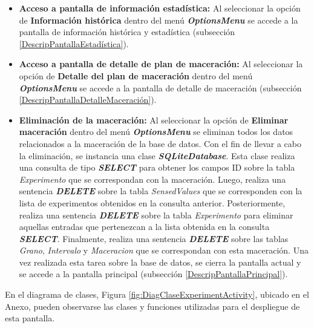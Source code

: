 \begin{itemize}
                    \item \textbf{Acceso a pantalla de información estadística:} Al seleccionar la opción de \textbf{Información histórica} dentro del menú \textbf{\textit{\gls{OptionsMenu}}} se accede a la pantalla de información histórica y estadística (subsección \ref{DescripPantallaEstadística}).
                    
                    \item \textbf{Acceso a pantalla de detalle de plan de maceración:} Al seleccionar la opción de \textbf{Detalle del plan de maceración} dentro del menú \textbf{\textit{\gls{OptionsMenu}}} se accede a la pantalla de detalle de maceración (subsección \ref{DescripPantallaDetalleMaceración}).
                    
                    \item \textbf{Eliminación de la maceración:} Al seleccionar la opción de \textbf{Eliminar maceración} dentro del menú \textbf{\textit{\gls{OptionsMenu}}} se eliminan todos los datos relacionados a la maceración de la base de datos. Con el fin de llevar a cabo la eliminación, se instancia una clase \textbf{\textit{\gls{SQLiteDatabase}}}. 
                    Esta clase realiza una consulta de tipo \textbf{\textit{\gls{SELECT}}} para obtener los campos ID sobre la tabla \textit{Experimento} que se correspondan con la maceración. Luego, realiza una sentencia \textbf{\textit{\gls{DELETE}}} sobre la tabla \textit{SensedValues} que se corresponden con la lista de experimentos obtenidos en la consulta anterior. Posteriormente, realiza una sentencia \textbf{\textit{\gls{DELETE}}} sobre la tabla \textit{Experimento} para eliminar aquellas entradas que pertenezcan a la lista obtenida en la consulta \textbf{\textit{\gls{SELECT}}}. Finalmente, realiza una sentencia \textbf{\textit{\gls{DELETE}}} sobre las tablas \textit{Grano}, \textit{Intervalo} y \textit{Maceracion} que se correspondan con esta maceración.
                    Una vez realizada esta tarea sobre la base de datos, se cierra la pantalla actual y se accede a la pantalla principal (subsección \ref{DescripPantallaPrincipal}).
                   
                \end{itemize}
                
                
                \par En el diagrama de clases, Figura \ref{fig:DiagClaseExperimentActivity}, ubicado en el Anexo, pueden observarse las clases y funciones utilizadas para el despliegue de esta pantalla.
            
